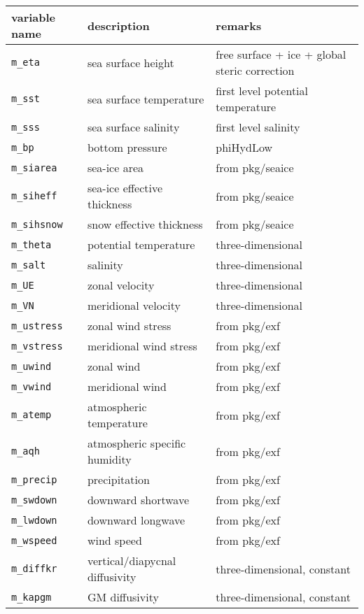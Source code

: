 \begin{table}[!ht]
\centering
\begin{tabular}{lll}
variable name				&	description				& remarks \\ \hline\hline
\texttt{m\_eta}				&	sea surface height			& free surface + ice + global steric correction \\
\texttt{m\_sst}				&	sea surface temperature		& first level potential temperature \\
\texttt{m\_sss}				&	sea surface salinity			& first level salinity \\ 
\texttt{m\_bp}				&	bottom pressure			& phiHydLow\\ 
\texttt{m\_siarea}			&	sea-ice area				& from pkg/seaice \\
\texttt{m\_siheff}			&	sea-ice effective thickness		& from pkg/seaice \\
\texttt{m\_sihsnow}			&	snow effective thickness		& from pkg/seaice \\ \hline
\texttt{m\_theta}				&	potential temperature		& three-dimensional \\
\texttt{m\_salt}				&	salinity					& three-dimensional \\
\texttt{m\_UE}				&	zonal velocity				& three-dimensional \\
\texttt{m\_VN}				&	meridional velocity			& three-dimensional \\ \hline
\texttt{m\_ustress}			&	zonal wind stress			& from pkg/exf \\
\texttt{m\_vstress}			&	meridional wind stress		& from pkg/exf\\
\texttt{m\_uwind}			&	zonal wind 				& from pkg/exf\\
\texttt{m\_vwind}			&	meridional wind 			& from pkg/exf\\
\texttt{m\_atemp}			&	atmospheric temperature		& from pkg/exf\\
\texttt{m\_aqh}				&	atmospheric specific humidity	& from pkg/exf\\
\texttt{m\_precip}			&	precipitation				& from pkg/exf\\
\texttt{m\_swdown}			&	downward shortwave		& from pkg/exf\\
\texttt{m\_lwdown}			&	downward longwave			& from pkg/exf\\
\texttt{m\_wspeed}			&	wind speed				& from pkg/exf\\ \hline
\texttt{m\_diffkr}				&	vertical/diapycnal diffusivity	& three-dimensional, constant \\ 
\texttt{m\_kapgm}			&	GM diffusivity				& three-dimensional, constant \\ 

\end{tabular}
\end{table}
